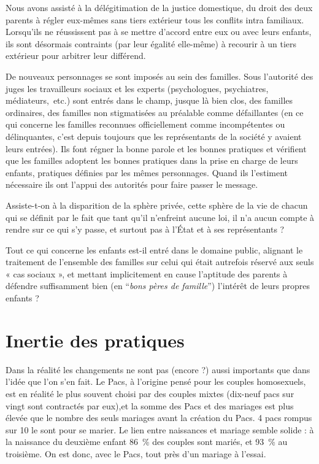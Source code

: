 Nous avons assisté à la délégitimation de la justice domestique, du droit des deux parents à régler eux-mêmes sans tiers extérieur tous les conflits intra familiaux. Lorsqu'ils ne réussissent pas à se mettre d'accord entre eux ou avec leurs enfants, ils sont désormais contraints (par leur égalité elle-même) à recourir à un tiers extérieur pour arbitrer leur différend.  

De nouveaux personnages se sont imposés au sein des familles. Sous l'autorité des juges les travailleurs sociaux et les experts (psychologues, psychiatres, médiateurs,~etc.) sont entrés dans le champ, jusque là bien clos, des familles ordinaires, des familles non stigmatisées au préalable comme défaillantes (en ce qui concerne les familles reconnues officiellement comme incompétentes ou délinquantes, c'est depuis toujours que les représentants de la société y avaient leurs entrées). Ils font régner la bonne parole et les bonnes pratiques et vérifient que les familles adoptent les bonnes pratiques dans la prise en charge de leurs enfants, pratiques définies par les mêmes personnages. Quand ils l'estiment nécessaire ils ont l'appui des autorités pour faire passer le message.


 

 Assiste-t-on à la disparition de la sphère privée, cette sphère de la vie de chacun qui se définit par le fait que tant qu'il n'enfreint aucune loi, il n'a aucun compte à rendre sur ce qui s'y passe, et surtout pas à l'État et à ses représentants ? 

 Tout ce qui concerne les enfants est-il entré dans le domaine public, alignant le traitement de l'ensemble des familles sur celui qui était autrefois réservé aux seuls « cas sociaux », et mettant implicitement en cause l'aptitude des parents à défendre suffisamment bien (en \enquote{\emph{bons pères de famille}}) l'intérêt de leurs propres enfants ?



\section{Inertie des pratiques}


 Dans la réalité les changements ne sont pas (encore ?) aussi importants que dans l'idée que l'on s'en fait. 
 Le Pacs, à l'origine pensé pour les couples homosexuels, est en réalité le plus souvent choisi par des couples mixtes (dix-neuf pacs sur vingt sont contractés par eux),et la somme des Pacs et des mariages est plus élevée que le nombre des seuls mariages avant la création du Pacs.  4 pacs rompus sur 10 le sont pour se marier. Le lien entre naissances et mariage semble solide : à la naissance du deuxième enfant 86~\% des couples sont mariés, et 93~\% au troisième. On est donc, avec le Pacs, tout près d'un mariage à l'essai. 
 
